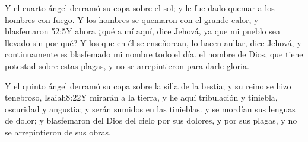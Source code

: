Y el cuarto ángel derramó su copa sobre el sol; y le fue dado quemar a los hombres con fuego. 
Y los hombres se quemaron con el grande calor, y blasfemaron%
					{52:5}{Y ahora ¿qué a mí aquí, dice Jehová, ya que mi pueblo sea llevado sin por qué? Y los que en él se enseñorean, lo hacen aullar, dice Jehová, y continuamente es blasfemado mi nombre todo el día.}
 el nombre de Dios, que tiene potestad sobre estas plagas, y no se arrepintieron para darle gloria.

Y el quinto ángel derramó su copa sobre la silla de la bestia; y su reino se hizo tenebroso,%
				  {Isaiah}{8:22}{Y mirarán a la tierra, y he aquí tribulación y tiniebla, oscuridad y angustia; y serán sumidos en las tinieblas.}
 y se mordían sus lenguas de dolor; 
y blasfemaron del Dios del cielo%
 por sus dolores, y por sus plagas, y no se arrepintieron de sus obras.

